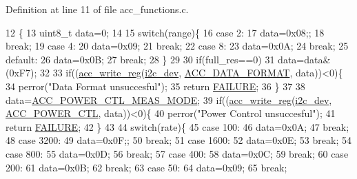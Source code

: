 Definition at line 11 of file acc\-\_\-functions.\-c.


\begin{DoxyCode}
12 \{ 
13   uint8\_t data=0;
14 
15   \textcolor{keywordflow}{switch}(range)\{
16     \textcolor{keywordflow}{case} 2:
17       data=0x08;;
18       \textcolor{keywordflow}{break};
19     \textcolor{keywordflow}{case} 4:
20       data=0x09;
21       \textcolor{keywordflow}{break};
22     \textcolor{keywordflow}{case} 8:
23       data=0x0A;
24       \textcolor{keywordflow}{break};
25     \textcolor{keywordflow}{default}:
26       data=0x0B;
27       \textcolor{keywordflow}{break};
28   \}
29   
30   \textcolor{keywordflow}{if}(full\_res==0)
31     data=data&(0xF7);
32   
33   \textcolor{keywordflow}{if}((\hyperlink{group__acc_ga534116416343122de29a5b6ade6876bd}{acc\_write\_reg}(\hyperlink{CommunicationV0_2communication_8c_a7751bd45ac1064efb35adf1f19c25db8}{i2c\_dev}, \hyperlink{communication_2imu__regs_8h_ab4eb7fc69b2a37ee750d3400fc2c53a1}{ACC\_DATA\_FORMAT}, data))<0)\{
34     perror(\textcolor{stringliteral}{"Data Format unsuccesful"});
35     \textcolor{keywordflow}{return} \hyperlink{calibration_2calibration_8h_a6d58f9ac447476b4e084d7ca383f5183}{FAILURE};
36   \}
37   
38   data=\hyperlink{communication_2imu__regs_8h_a9a841ba3e094b01ea439584e12b25894}{ACC\_POWER\_CTL\_MEAS\_MODE};
39   \textcolor{keywordflow}{if}((\hyperlink{group__acc_ga534116416343122de29a5b6ade6876bd}{acc\_write\_reg}(\hyperlink{CommunicationV0_2communication_8c_a7751bd45ac1064efb35adf1f19c25db8}{i2c\_dev}, \hyperlink{communication_2imu__regs_8h_ad857d62b61f349216faeda06eff5f9c6}{ACC\_POWER\_CTL}, data))<0)\{
40     perror(\textcolor{stringliteral}{"Power Control unsuccesful"});
41     \textcolor{keywordflow}{return} \hyperlink{calibration_2calibration_8h_a6d58f9ac447476b4e084d7ca383f5183}{FAILURE};
42   \}
43   
44   \textcolor{keywordflow}{switch}(rate)\{
45     \textcolor{keywordflow}{case} 100:
46       data=0x0A;
47       \textcolor{keywordflow}{break};
48     \textcolor{keywordflow}{case} 3200:
49       data=0x0F;;
50       \textcolor{keywordflow}{break};
51     \textcolor{keywordflow}{case} 1600:
52       data=0x0E;
53       \textcolor{keywordflow}{break};
54     \textcolor{keywordflow}{case} 800:
55       data=0x0D;
56       \textcolor{keywordflow}{break};
57     \textcolor{keywordflow}{case} 400:
58       data=0x0C;
59       \textcolor{keywordflow}{break};
60     \textcolor{keywordflow}{case} 200:
61       data=0x0B;
62       \textcolor{keywordflow}{break};
63     \textcolor{keywordflow}{case} 50:
64       data=0x09;
65       \textcolor{keywordflow}{break}; 

\end{DoxyCode}
